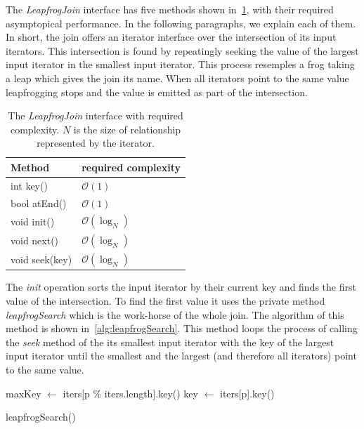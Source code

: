 The \textit{LeapfrogJoin} interface has five methods shown in~\cref{table:leapfrogJoin-interface}, with their required asymptopical
performance.
In the following paragraphs, we explain each of them.
In short, the join offers an iterator interface over the intersection of its input iterators.
This intersection is found by repeatingly seeking the value of the largest input iterator in the smallest input iterator.
This process resemples a frog taking a leap which gives the join its name.
When all iterators point to the same value leapfrogging stops and the value is emitted as part of the intersection.

\begin{table}
    \centering
    \begin{tabular}{@{}ll@{}}
        \toprule
        Method         &  required complexity    \\
        \midrule
        int key()      &  $\mathcal{O}(1)$       \\
        bool atEnd()   &  $\mathcal{O}(1)$       \\
        void init()    &  $\mathcal{O}(\log_N)$  \\
        void next()    &  $\mathcal{O}(\log_N)$  \\
        void seek(key) &  $\mathcal{O}(\log_N)$  \\
        \bottomrule
    \end{tabular}
    \caption{
    The \textit{LeapfrogJoin} interface with required complexity.
    $N$ is the size of relationship represented by the iterator.
    }
    \label{table:leapfrogJoin-interface}
\end{table}


The \textit{init} operation sorts the input iterator by their current key and finds the first value of the intersection.
To find the first value it uses the private method \textit{leapfrogSearch} which is the work-horse of the whole join.
The algorithm of this method is shown in~\cref{alg:leapfrogSearch}.
This method loops the process of calling the \textit{seek} method of the its smallest input iterator with the key of the largest input
iterator until the smallest and the largest (and therefore all iterators) point to the same value.


\begin{algorithm}
    maxKey $\gets$ iters[p \% iters.length].key()\;
   key $\leftarrow$ iters[p].key()
   \caption{leapfrogSearch()}
   \label{alg:leapfrogSearch}
\end{algorithm}


